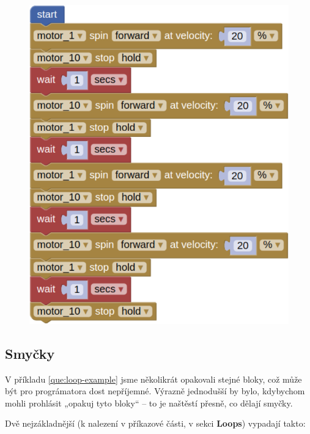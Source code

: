 \documentclass[../main.tex]{subfiles}
\begin{document}
	\begin{solution}
		\begin{figure}
			\centering
			\begin{minipage}{0.5\textwidth}
				\includegraphics[width=\linewidth]{../Images/02/sol3.png}
			\end{minipage}
		\end{figure}
	\end{solution}

	\subsection{Smyčky}
	V příkladu \ref{que:loop-example} jsme několikrát opakovali stejné bloky, což může být pro prográmatora dost nepříjemné. Výrazně jednodušší by bylo, kdybychom mohli prohlásit „opakuj tyto bloky“ -- to je naštěstí přesně, co dělají smyčky.

	Dvě nejzákladnější (k nalezení v příkazové části, v sekci \textbf{Loops}) vypadají takto:
	\begin{itemize}
		\blockLoop
		\blockLoopForever
	\end{itemize}
\end{document}
